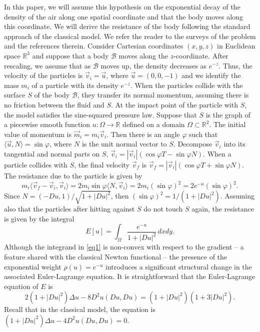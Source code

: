 \documentclass[preprint,11pt]{elsarticle}
\theoremstyle{definition}
\def\r{\mathbb R}
\begin{document}
In this paper, we will assume this hypothesis on the exponential decay of the density of the air along one spatial  coordinate and that the body moves along this coordinate. We will derive  the  resistance of the body following the standard approach of the classical model. We refer the reader to the surveys of the problem \cite{bu,bk} and the references therein. Consider Cartesian coordinates $(x,y,z)$ in Euclidean space $\r^3$ and suppose that a body $\mathcal{B}$ moves along the $z$-coordinate. After rescaling, we assume that as $\mathcal{B}$ moves up, the density decreases as $e^{-z}$. Thus, the velocity of the particles is $\vec{v}_i=\vec{u}$, where $\vec{u}=(0,0,-1)$ and we identify the mass $m_i$ of a particle with its density $e^{-z}$. When the particles collide with the surface $S$ of the body  $\mathcal{B}$, they transfer its normal momentum, assuming there is no friction between the fluid and   $S$. At the impact point of the particle with $S$, the model satisfies the sine-squared pressure law. Suppose that $S$ is the graph of a piecewise smooth function $u\colon\Omega\to\r$ defined on a domain $\Omega\subset\r^2$. The  initial value of momentum is $\vec{m}_i=m_i\vec{v}_i$. Then there is an angle  $\varphi$ such that 
$\langle\vec{u},N\rangle=\sin\varphi$, where $N$ is the unit normal vector to $S$. Decompose $\vec{v}_i$ into its tangential and normal parts on $S$, 
 $\vec{v}_i=|\vec{v}_i|(\cos\varphi T-\sin\varphi N)$. When a particle collides with $S$, the final velocity $\vec{v}_f$ is  $\vec{v}_f=|\vec{v}_i|(\cos\varphi T+\sin\varphi N)$. The resistance due to the particle is given by  
 $$m_i\langle \vec{v}_f-\vec{v}_i,\vec{v}_i\rangle=2m_i\sin\varphi \langle N,\vec{v}_i\rangle=2m_i(\sin\varphi)^2=2e^{-u}(\sin\varphi)^2.$$
 Since  $N=(-Du,1)/\sqrt{1+|Du|^2}$, then $(\sin\varphi)^2=1/(1+|Du|^2)$. 
 Assuming also that the particles after hitting against $S$ do not touch   $S$ again, the  resistance   is given by the integral
 \begin{equation}\label{eq1}
 E[u]=\int_\Omega \frac{e^{-u}}{1+|Du|^2}\, dxdy.
 \end{equation}
 Although the integrand in \eqref{eq1} is non-convex with respect to the gradient -- a feature shared with the classical Newton functional -- the presence of the exponential weight $\rho(u)=e^{-u}$ introduces a significant structural change in the associated Euler-Lagrange equation. It is straightforward that the Euler-Lagrange equation of $E$ is 
 \begin{equation}\label{q0}
2(1+|Du|^2)\Delta u 
- 8 D^2u(Du,Du)
= (1+|Du|^2)(1+3|Du|^2).
\end{equation}
 Recall that in the classical model, the equation is  $(1+|Du|^2)\Delta u-4 D^2u(Du,Du)=0$. 
 
\end{document}
